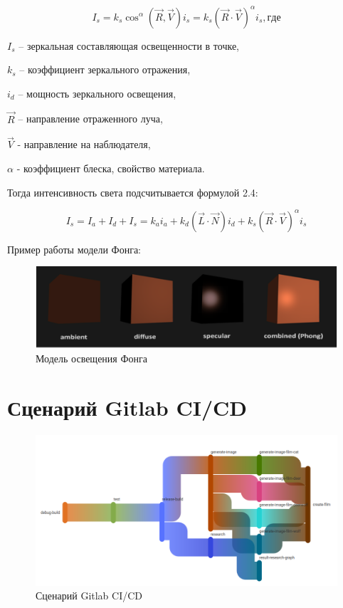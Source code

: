 \begin{equation}
	I_s=k_s {\cos^{\alpha}{(\vec{R},\vec{V})}}i_s=k_s(\vec{R}\cdot\vec{V})^{\alpha}i_s , где
\end{equation}

$I_s$ – зеркальная составляющая освещенности в точке,

$k_s$ – коэффициент зеркального отражения,

$i_d$ – мощность зеркального освещения,

$\vec{R}$ – направление отраженного луча,

$\vec{V}$ - направление на наблюдателя,

$\alpha$ - коэффициент блеска, свойство материала.
\newline

Тогда интенсивность света подсчитывается формулой 2.4:

\begin{equation}
	I_s= I_a + I_d + I_s = k_a i_a + k_d(\vec{L}\cdot\vec{N})i_d + k_s(\vec{R}\cdot\vec{V})^{\alpha}i_s
\end{equation}

Пример работы модели Фонга:

\begin{figure}[H]
	\begin{center}
		\includegraphics[width=\linewidth]{images/phong}
	\end{center}
	\captionsetup{justification=centering}
	\caption{Модель освещения Фонга}
	\label{img:s1}
\end{figure}

\section{Сценарий Gitlab CI/CD}

\begin{figure}[H]
	\begin{center}
		\includegraphics[width=\linewidth]{images/gitlab}
	\end{center}
	\captionsetup{justification=centering}
	\caption{Сценарий Gitlab CI/CD}
	\label{img:s1}
\end{figure}



